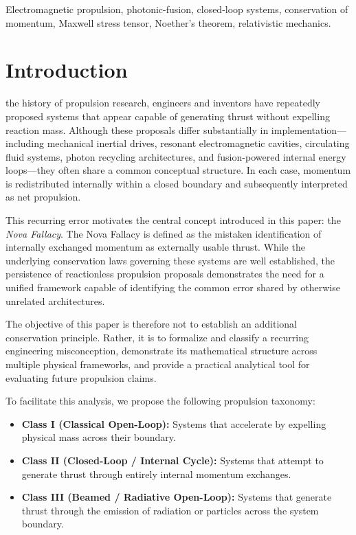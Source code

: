 \documentclass[journal,10pt,twoside]{IEEEtran}
\renewcommand{\IEEEPARstart}[2]{\noindent{\fontsize{28pt}{30pt}\selectfont #1}{\MakeUppercase{#2}}}
\begin{document}
\begin{IEEEkeywords}
Electromagnetic propulsion, photonic-fusion, closed-loop systems, conservation of momentum, Maxwell stress tensor, Noether's theorem, relativistic mechanics.
\end{IEEEkeywords}

\section{Introduction}
\label{sec:intro}
\IEEEPARstart{T}{hroughout} the history of propulsion research, engineers and inventors have repeatedly proposed systems that appear capable of generating thrust without expelling reaction mass. Although these proposals differ substantially in implementation---including mechanical inertial drives, resonant electromagnetic cavities, circulating fluid systems, photon recycling architectures, and fusion-powered internal energy loops---they often share a common conceptual structure. In each case, momentum is redistributed internally within a closed boundary and subsequently interpreted as net propulsion.

This recurring error motivates the central concept introduced in this paper: the \textit{Nova Fallacy}. The Nova Fallacy is defined as the mistaken identification of internally exchanged momentum as externally usable thrust. While the underlying conservation laws governing these systems are well established, the persistence of reactionless propulsion proposals demonstrates the need for a unified framework capable of identifying the common error shared by otherwise unrelated architectures.

The objective of this paper is therefore not to establish an additional conservation principle. Rather, it is to formalize and classify a recurring engineering misconception, demonstrate its mathematical structure across multiple physical frameworks, and provide a practical analytical tool for evaluating future propulsion claims.

To facilitate this analysis, we propose the following propulsion taxonomy:

\begin{itemize}
    \item \textbf{Class I (Classical Open-Loop):} Systems that accelerate by expelling physical mass across their boundary.
    \item \textbf{Class II (Closed-Loop / Internal Cycle):} Systems that attempt to generate thrust through entirely internal momentum exchanges.
    \item \textbf{Class III (Beamed / Radiative Open-Loop):} Systems that generate thrust through the emission of radiation or particles across the system boundary.
\end{itemize}
\end{document}
